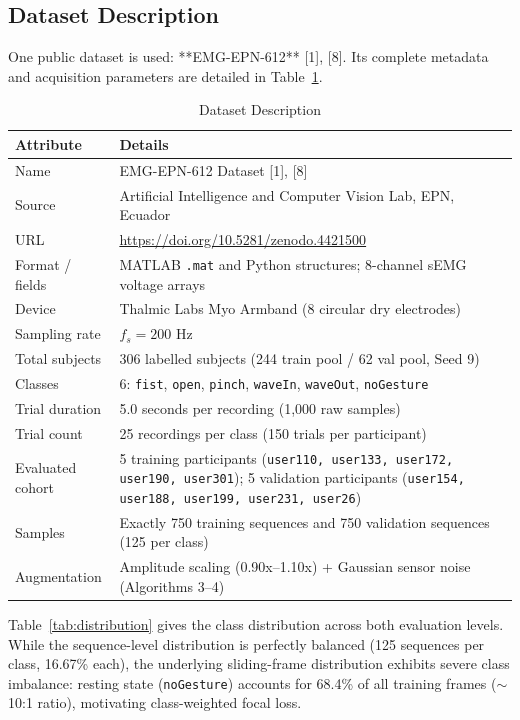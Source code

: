 \documentclass[conference]{IEEEtran}
\begin{document}
\subsection{Dataset Description}
One public dataset is used: **EMG-EPN-612** [1], [8]. Its complete metadata and acquisition parameters are detailed in Table~\ref{tab:dataset}.

\begin{table}[h]
\centering
\caption{Dataset Description}
\label{tab:dataset}
\begin{tabular}{p{2.3cm}p{5.5cm}}
\toprule
\textbf{Attribute} & \textbf{Details} \\
\midrule
Name & EMG-EPN-612 Dataset [1], [8] \\
Source & Artificial Intelligence and Computer Vision Lab, EPN, Ecuador \\
URL & \url{https://doi.org/10.5281/zenodo.4421500} \\
Format / fields & MATLAB \texttt{.mat} and Python structures; 8-channel sEMG voltage arrays \\
Device & Thalmic Labs Myo Armband (8 circular dry electrodes) \\
Sampling rate & $f_s = 200\text{ Hz}$ \\
Total subjects & 306 labelled subjects (244 train pool / 62 val pool, Seed 9) \\
Classes & 6: \texttt{fist}, \texttt{open}, \texttt{pinch}, \texttt{waveIn}, \texttt{waveOut}, \texttt{noGesture} \\
Trial duration & 5.0 seconds per recording (1,000 raw samples) \\
Trial count & 25 recordings per class (150 trials per participant) \\
Evaluated cohort & 5 training participants (\texttt{user110, user133, user172, user190, user301}); 5 validation participants (\texttt{user154, user188, user199, user231, user26}) \\
Samples & Exactly 750 training sequences and 750 validation sequences (125 per class) \\
Augmentation & Amplitude scaling (0.90x--1.10x) + Gaussian sensor noise (Algorithms 3--4) \\
\bottomrule
\end{tabular}
\end{table}

Table~\ref{tab:distribution} gives the class distribution across both evaluation levels. While the sequence-level distribution is perfectly balanced (125 sequences per class, 16.67\% each), the underlying sliding-frame distribution exhibits severe class imbalance: resting state (\texttt{noGesture}) accounts for 68.4\% of all training frames ($\sim$10:1 ratio), motivating class-weighted focal loss.
\end{document}

